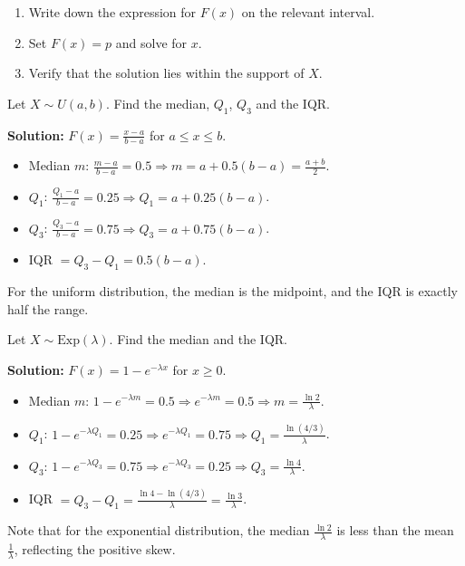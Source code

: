 \documentclass[11pt]{article}
\begin{document}
\begin{methode}
\begin{enumerate}
\item Write down the expression for \(F(x)\) on the relevant interval.
\item Set \(F(x) = p\) and solve for \(x\).
\item Verify that the solution lies within the support of \(X\).
\end{enumerate}
\end{methode}

\begin{exemplebox}
Let \(X \sim U(a,b)\). Find the median, \(Q_1\), \(Q_3\) and the IQR.

\textbf{Solution:}
\(F(x) = \frac{x-a}{b-a}\) for \(a \le x \le b\).
\begin{itemize}
\item Median \(m\): \(\frac{m-a}{b-a} = 0.5 \Rightarrow m = a + 0.5(b-a) = \frac{a+b}{2}\).
\item \(Q_1\): \(\frac{Q_1-a}{b-a} = 0.25 \Rightarrow Q_1 = a + 0.25(b-a)\).
\item \(Q_3\): \(\frac{Q_3-a}{b-a} = 0.75 \Rightarrow Q_3 = a + 0.75(b-a)\).
\item IQR \(= Q_3 - Q_1 = 0.5(b-a)\).
\end{itemize}
For the uniform distribution, the median is the midpoint, and the IQR is exactly half the range.
\end{exemplebox}

\begin{exemplebox}
Let \(X \sim \text{Exp}(\lambda)\). Find the median and the IQR.

\textbf{Solution:}
\(F(x) = 1 - e^{-\lambda x}\) for \(x \ge 0\).
\begin{itemize}
\item Median \(m\): \(1 - e^{-\lambda m} = 0.5 \Rightarrow e^{-\lambda m} = 0.5 \Rightarrow m = \frac{\ln 2}{\lambda}\).
\item \(Q_1\): \(1 - e^{-\lambda Q_1} = 0.25 \Rightarrow e^{-\lambda Q_1} = 0.75 \Rightarrow Q_1 = \frac{\ln(4/3)}{\lambda}\).
\item \(Q_3\): \(1 - e^{-\lambda Q_3} = 0.75 \Rightarrow e^{-\lambda Q_3} = 0.25 \Rightarrow Q_3 = \frac{\ln 4}{\lambda}\).
\item IQR \(= Q_3 - Q_1 = \frac{\ln 4 - \ln(4/3)}{\lambda} = \frac{\ln 3}{\lambda}\).
\end{itemize}
Note that for the exponential distribution, the median \(\frac{\ln 2}{\lambda}\) is less than the mean \(\frac{1}{\lambda}\), reflecting the positive skew.
\end{exemplebox}
\end{document}
